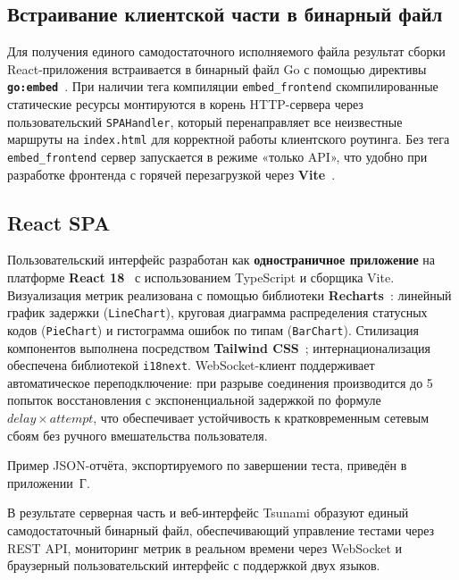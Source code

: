 \subsection*{Встраивание клиентской части в бинарный файл}

Для получения единого самодостаточного исполняемого файла результат сборки React-приложения встраивается в бинарный файл Go с помощью директивы \textbf{\texttt{go:embed}}~\cite{gospec}.
При наличии тега компиляции \texttt{embed\_frontend} скомпилированные статические ресурсы монтируются в корень HTTP-сервера через пользовательский \texttt{SPAHandler}, который перенаправляет все неизвестные маршруты на \texttt{index.html} для корректной работы клиентского роутинга.
Без тега \texttt{embed\_frontend} сервер запускается в режиме «только API», что удобно при разработке фронтенда с горячей перезагрузкой через \textbf{Vite}~\cite{vite}.

\subsection*{React SPA}

Пользовательский интерфейс разработан как \textbf{одностраничное приложение} на платформе \textbf{React 18}~\cite{react} с использованием TypeScript и сборщика Vite.
Визуализация метрик реализована с помощью библиотеки \textbf{Recharts}~\cite{recharts}: линейный график задержки (\texttt{LineChart}), круговая диаграмма распределения статусных кодов (\texttt{PieChart}) и гистограмма ошибок по типам (\texttt{BarChart}).
Стилизация компонентов выполнена посредством \textbf{Tailwind CSS}~\cite{tailwind}; интернационализация обеспечена библиотекой \texttt{i18next}.
WebSocket-клиент поддерживает автоматическое переподключение: при разрыве соединения производится до 5 попыток восстановления с экспоненциальной задержкой по формуле \(\mathit{delay} \times \mathit{attempt}\), что обеспечивает устойчивость к кратковременным сетевым сбоям без ручного вмешательства пользователя.

Пример JSON-отчёта, экспортируемого по завершении теста, приведён в приложении~Г.

В результате серверная часть и веб-интерфейс Tsunami образуют единый самодостаточный бинарный файл, обеспечивающий управление тестами через REST API, мониторинг метрик в реальном времени через WebSocket и браузерный пользовательский интерфейс с поддержкой двух языков.


